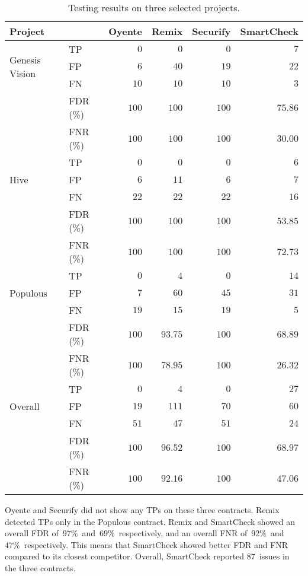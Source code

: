 \begin{table*}[t]
	\centering
	\caption{Testing results on three selected projects.}
	\begin{tabular}{|l|l|r|r|r|r|}
		\hline
		\textbf{Project} &  & \textbf{Oyente} & \textbf{Remix} & \textbf{Securify} & \textbf{SmartCheck} \\
		\hline
		\multirow{3}{*}{Genesis Vision}
			& TP & $0$ & $0$ & $0$ & $7$ \\
			& FP & $6$ & $40$ & $19$ & $22$ \\
			& FN & $10$ & $10$ & $10$ & $3$ \\
			& FDR (\%) & $100$ & $100$ & $100$ & $75.86$ \\
			& FNR (\%) & $100$ & $100$ & $100$ & $30.00$ \\
		\hline
		\multirow{3}{*}{Hive}
			& TP & $0$ & $0$ & $0$ & $6$ \\
			& FP & $6$ & $11$ & $6$ & $7$ \\
			& FN & $22$ & $22$ & $22$ & $16$ \\
			& FDR (\%) & $100$ & $100$ & $100$ & $53.85$ \\
			& FNR (\%) & $100$ & $100$ & $100$ & $72.73$ \\
		\hline
		\multirow{3}{*}{Populous}
			& TP & $0$ & $4$ & $0$ & $14$ \\
			& FP & $7$ & $60$ & $45$ & $31$ \\
			& FN & $19$ & $15$ & $19$ & $5$ \\
			& FDR (\%) & $100$ & $93.75$ & $100$ & $68.89$ \\
			& FNR (\%) & $100$ & $78.95$ & $100$ & $26.32$ \\
		\hline
		\multirow{3}{*}{Overall}
			& TP & $0$ & $4$ & $0$ & $27$ \\
			& FP & $19$ & $111$ & $70$ & $60$ \\
			& FN & $51$ & $47$ & $51$ & $24$ \\
			& FDR (\%) & $100$ & $96.52$ & $100$ & $68.97$ \\
			& FNR (\%) & $100$ & $92.16$ & $100$ & $47.06$ \\
		\hline
	\end{tabular}
	\label{CaseStudyTable}
\end{table*}

Oyente and Securify did not show any TPs on these three contracts.
Remix detected TPs only in the Populous contract.
Remix and SmartCheck showed an overall FDR of~$97\%$~and~$69\%$~respectively, and an overall FNR of~$92\%$~and~$47\%$~respectively.
This means that SmartCheck showed better FDR and FNR compared to its closest competitor.
Overall, SmartCheck reported $87$~issues in the three contracts.

